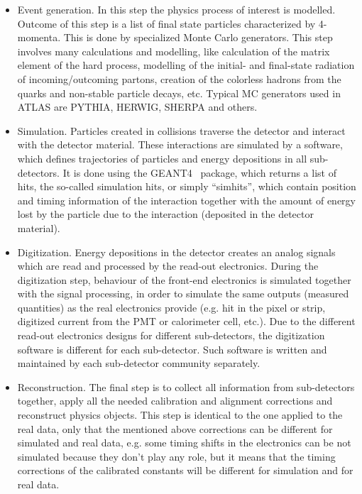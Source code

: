 \begin{itemize}
 \item Event generation. In this step the physics process of interest is modelled. Outcome of this step is a list of final state particles characterized by 4-momenta. 
This is done by specialized Monte Carlo generators. 
This step involves many calculations and modelling, like calculation of the matrix element of the hard process, modelling of the initial- and final-state radiation of incoming/outcoming partons,
creation of the colorless hadrons from the quarks and non-stable particle decays, etc. 
Typical MC generators used in ATLAS
 are PYTHIA, HERWIG, SHERPA and others.
 \item Simulation. Particles created in collisions traverse the detector and interact with the detector material. These interactions are simulated by a software, which defines trajectories of particles and energy depositions in all sub-detectors. 
 It is done using the GEANT4~\cite{Agostinelli:2002hh} package, which returns a list of hits, the so-called simulation hits, or simply ``simhits'', which contain position and timing information of 
 the interaction together with the amount of energy lost by the particle due to the interaction (deposited in the detector material).
 \item Digitization. Energy depositions in the detector creates an analog signals which are read and processed by the read-out electronics. During the digitization step, behaviour of the front-end electronics is simulated together with the signal processing, in order to simulate the same outputs (measured quantities) as the real electronics provide (e.g. hit in the pixel or strip,
 digitized current from the PMT or calorimeter cell, etc.). Due to the different read-out electronics designs for different sub-detectors, the digitization software is different for each sub-detector.
 Such software is written and maintained by each sub-detector community separately.
 \item Reconstruction. The final step is to collect all information from sub-detectors together, apply all the needed calibration and alignment corrections and reconstruct physics objects. This step is identical to the one applied to the real data, only that the mentioned above corrections can be different for simulated and real 
 data, e.g. some timing shifts in the electronics can be not simulated because they don't play any role, but it means that the timing corrections of the calibrated constants will be different for simulation and for real data.
\end{itemize}

